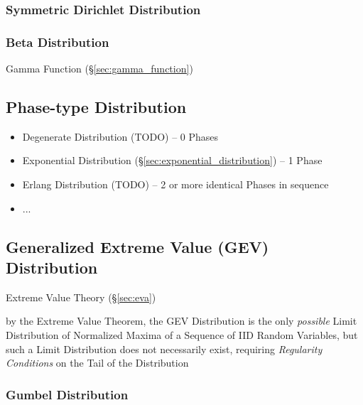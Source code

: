 \subsubsection{Symmetric Dirichlet Distribution}\label{sec:symmetric_dirichlet}

\subsubsection{Beta Distribution}\label{sec:beta_distribution}

Gamma Function (\S\ref{sec:gamma_function})



\subsection{Phase-type Distribution}\label{sec:phasetype_distribution}

\begin{itemize}
  \item Degenerate Distribution (TODO) -- 0
    Phases
  \item Exponential Distribution (\S\ref{sec:exponential_distribution}) -- 1
    Phase
  \item Erlang Distribution (TODO) -- 2 or more identical Phases in sequence
  \item ...
\end{itemize}



\subsection{Generalized Extreme Value (GEV) Distribution}\label{sec:gev}

Extreme Value Theory (\S\ref{sec:eva})

by the Extreme Value Theorem, the GEV Distribution is the only \emph{possible}
Limit Distribution of Normalized Maxima of a Sequence of IID Random Variables,
but such a Limit Distribution does not necessarily exist, requiring
\emph{Regularity Conditions} on the Tail of the Distribution



\subsubsection{Gumbel Distribution}\label{sec:gumbel_distribution}

